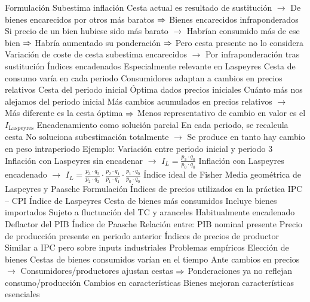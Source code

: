 \documentclass{nuevotema}
\begin{document}
\begin{esquemal}
				\4 Formulación
				\4[] 
				\4 Subestima inflación
				\4[] Cesta actual es resultado de sustitución
				\4[] $\to$ De bienes encarecidos por otros más baratos
				\4[] $\Rightarrow$ Bienes encarecidos infraponderados
				\4[] Si precio de un bien hubiese sido más barato
				\4[] $\to$ Habrían consumido más de ese bien
				\4[] $\Rightarrow$ Habría aumentado su ponderación
				\4[] $\Rightarrow$ Pero cesta presente no lo considera
				\4[] Variación de coste de cesta subestima encarecidos
				\4[] $\to$ Por infraponderación tras sustitución
			\3 Índices encadenados
				\4 Especialmente relevante en Laspeyres
				\4 Cesta de consumo varía en cada periodo
				\4[] Consumidores adaptan a cambios en precios relativos
				\4 Cesta del periodo inicial
				\4[] Óptima dados precios iniciales
				\4 Cuánto más nos alejamos del periodo inicial
				\4[] Más cambios acumulados en precios relativos
				\4[] $\to$ Más diferente es la cesta óptima
				\4[] $\Rightarrow$ Menos representativo de cambio en valor es el $I_\text{Laspeyres}$
				\4 Encadenamiento como solución parcial
				\4[] En cada periodo, se recalcula cesta
				\4[] No soluciona subestimación totalmente
				\4[] $\to$ Se produce en tanto hay cambio en peso intraperiodo
				\4 Ejemplo:
				\4[] Variación entre periodo inicial y periodo 3
				\4[] Inflación con Laspeyres sin encadenar
				\4[] $\to$ $I_L = \frac{p_3 \cdot q_0}{p_0 \cdot q_0}$
				\4[] Inflación con Laspeyres encadenado
				\4[] $\to$ $I_L = \frac{p_3 \cdot q_2}{p_2 \cdot q_2} \cdot \frac{p_2 \cdot q_1}{p_1 \cdot q_1} \cdot \frac{p_1 \cdot q_0}{p_0 \cdot q_0}$
			\3 Índice ideal de Fisher
				\4 Media geométrica de Laspeyres y Paasche
				\4 Formulación
				\4[] 
		\2 Índices de precios utilizados en la práctica
			\3 IPC -- CPI
				\4 Índice de Laspeyres
				\4 Cesta de bienes más consumidos
				\4 Incluye bienes importados
				\4[] Sujeto a fluctuación del TC y aranceles
				\4 Habitualmente encadenado
			\3 Deflactor del PIB
				\4 Índice de Paasche
				\4 Relación entre:
				\4[] PIB nominal presente
				\4[] Precio de producción presente en periodo anterior
			\3 Índices de precios de productor
				\4 Similar a IPC pero sobre inputs industriales
		\2 Problemas empíricos
			\3 Elección de bienes
				\4 Cestas de bienes consumidos varían en el tiempo
				\4[] Ante cambios en precios
				\4[] $\to$ Consumidores/productores ajustan cestas
				\4[] $\Rightarrow$ Ponderaciones ya no reflejan consumo/producción
			\3 Cambios en características
				\4 Bienes mejoran características esenciales

\end{esquemal}
\end{document}
